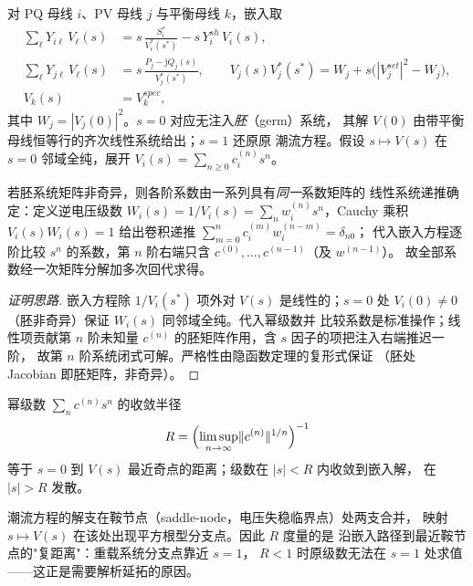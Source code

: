 \begin{definition}[全纯嵌入与幂级数]\label{sec:pf-th-glob-def-helm}
对 PQ 母线 $i$、PV 母线 $j$ 与平衡母线 $k$，嵌入取
\begin{align}
\sum_{\ell}Y_{i\ell}\,V_\ell(s)
&=s\,\frac{S_i^{*}}{V_i^{*}(s^{*})}-s\,Y_i^{sh}\,V_i(s),\\
\sum_{\ell}Y_{j\ell}\,V_\ell(s)
&=s\,\frac{P_j-\mathrm j Q_j(s)}{V_j^{*}(s^{*})},\qquad
V_j(s)V_j^{*}(s^{*})=W_j+s\bigl(|V_j^{set}|^2-W_j\bigr),\\
V_k(s)&=V_k^{spec},
\end{align}
其中 $W_j=|V_j(0)|^2$。$s=0$ 对应无注入\emph{胚}（germ）系统，
其解 $V(0)$ 由带平衡母线恒等行的齐次线性系统给出；$s=1$ 还原原
潮流方程。假设 $s\mapsto V(s)$ 在 $s=0$ 邻域全纯，展开
$V_i(s)=\sum_{n\ge0}c_i^{(n)}s^n$。
\end{definition}

\begin{proposition}[系数递推]\label{sec:pf-th-glob-prop-helmrec}
若胚系统矩阵非奇异，则各阶系数由一系列具有\emph{同一}系数矩阵的
线性系统递推确定：定义逆电压级数 $W_i(s)=1/V_i(s)=\sum_n
w_i^{(n)}s^n$，Cauchy 乘积 $V_i(s)W_i(s)=1$ 给出卷积递推
$\sum_{m=0}^{n}c_i^{(m)}w_i^{(n-m)}=\delta_{n0}$；
代入嵌入方程逐阶比较 $s^n$ 的系数，第 $n$ 阶右端只含
$c^{(0)},\ldots,c^{(n-1)}$（及 $w^{(n-1)}$）。
故全部系数经一次矩阵分解加多次回代求得。
\end{proposition}

\begin{proof}[证明思路]
嵌入方程除 $1/V_i(s^{*})$ 项外对 $V(s)$ 是线性的；$s=0$ 处
$V_i(0)\ne0$（胚非奇异）保证 $W_i(s)$ 同邻域全纯。代入幂级数并
比较系数是标准操作；线性项贡献第 $n$ 阶未知量
$c^{(n)}$ 的胚矩阵作用，含 $s$ 因子的项把注入右端推迟一阶，
故第 $n$ 阶系统闭式可解。严格性由隐函数定理的复形式保证
（胚处 Jacobian 即胚矩阵，非奇异）。
\end{proof}

\begin{theorem}\label{sec:pf-th-glob-thm-ch}
幂级数 $\sum_n c^{(n)}s^n$ 的收敛半径
\begin{equation}
R=\Bigl(\limsup_{n\to\infty}\lVert c^{(n)}\rVert^{1/n}\Bigr)^{-1}
\end{equation}
等于 $s=0$ 到 $V(s)$ 最近奇点的距离；级数在 $|s|<R$ 内收敛到嵌入解，
在 $|s|>R$ 发散。
\end{theorem}

\begin{remark}[奇点的物理含义]\label{sec:pf-th-glob-rem-helmsing}
潮流方程的解支在鞍节点（saddle-node，电压失稳临界点）处两支合并，
映射 $s\mapsto V(s)$ 在该处出现平方根型分支点。因此 $R$ 度量的是
沿嵌入路径到最近鞍节点的"复距离"：重载系统分支点靠近 $s=1$，
$R<1$ 时原级数无法在 $s=1$ 处求值——这正是需要解析延拓的原因。
\end{remark}

